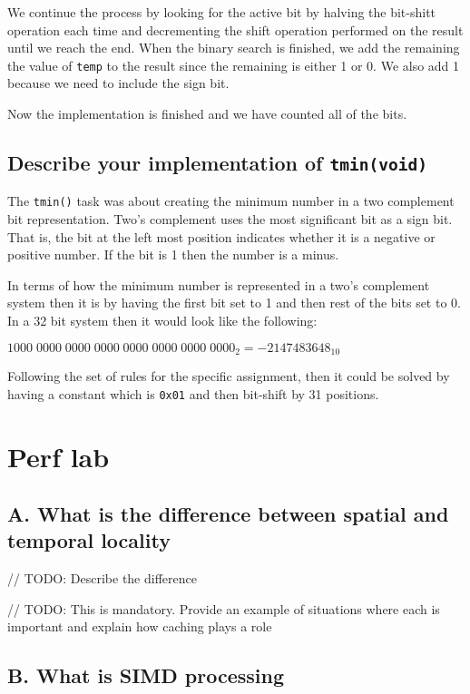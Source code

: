 \documentclass[11pt]{article}
\newcommand{\code}[1]{{\colorbox{lightgray!15}{\color{orange}\texttt{#1}}}}
\begin{document}
We continue the process by looking for the active bit by halving the bit-shitt operation each time 
and decrementing the shift operation performed on the result until we reach the end.
When the binary search is finished, we add the remaining the value of \code{temp} to the result
since the remaining is either 1 or 0. We also add 1 because we need to include the sign bit.

Now the implementation is finished and we have counted all of the bits.


\subsection{Describe your implementation of \code{tmin(void)}}
The \code{tmin()} task was about creating the minimum number in a two complement bit representation.
Two's complement uses the most significant bit as a sign bit. That is, the bit at the left most position indicates whether 
it is a negative or positive number. If the bit is 1 then the number is a minus. 

In terms of how the minimum number is represented in a two's complement system then it is by having the first bit set to 1 and then rest of the bits set to 0.
In a 32 bit system then it would look like the following:

$1000 \; 0000 \; 0000 \; 0000 \; 0000 \; 0000 \; 0000 \; 0000_2 = -2147483648_{10}$

Following the set of rules for the specific assignment, then it could be solved by having a constant which is \code{0x01}
and then bit-shift by 31 positions.   

\section{Perf lab}

\subsection{A. What is the difference between spatial and temporal locality}

// TODO: Describe the difference

// TODO: This is mandatory. Provide an example of situations where each is important and explain how caching plays a role

\subsection{B. What is SIMD processing}
\end{document}
